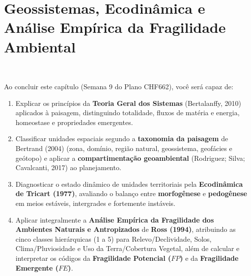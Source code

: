 
\chapter{Geossistemas, Ecodinâmica e Análise Empírica da Fragilidade Ambiental}
\label{cap:geossistemas_fragilidade}

\noindent\tagEmenta\ \tagPratica

\begin{capObjetivos}
Ao concluir este capítulo (Semana 9 do Plano CHF662), você será capaz de:
\begin{enumerate}[leftmargin=1.6em, itemsep=2pt]
  \item Explicar os princípios da \textbf{Teoria Geral dos Sistemas} (Bertalanffy, 2010) aplicados à paisagem, distinguindo totalidade, fluxos de matéria e energia, homeostase e propriedades emergentes.
  \item Classificar unidades espaciais segundo a \textbf{taxonomia da paisagem} de Bertrand (2004) (zona, domínio, região natural, geossistema, geofácies e geótopo) e aplicar a \textbf{compartimentação geoambiental} (Rodriguez; Silva; Cavalcanti, 2017) ao planejamento.
  \item Diagnosticar o estado dinâmico de unidades territoriais pela \textbf{Ecodinâmica de Tricart (1977)}, avaliando o balanço entre \textbf{morfogênese} e \textbf{pedogênese} em meios estáveis, intergrades e fortemente instáveis.
  \item Aplicar integralmente a \textbf{Análise Empírica da Fragilidade dos Ambientes Naturais e Antropizados} de \textbf{Ross (1994)}, atribuindo as cinco classes hierárquicas (1 a 5) para Relevo/Declividade, Solos, Clima/Pluviosidade e Uso da Terra/Cobertura Vegetal, além de calcular e interpretar os códigos da \textbf{Fragilidade Potencial ($FP$)} e da \textbf{Fragilidade Emergente ($FE$)}.
\end{enumerate}
\end{capObjetivos}

